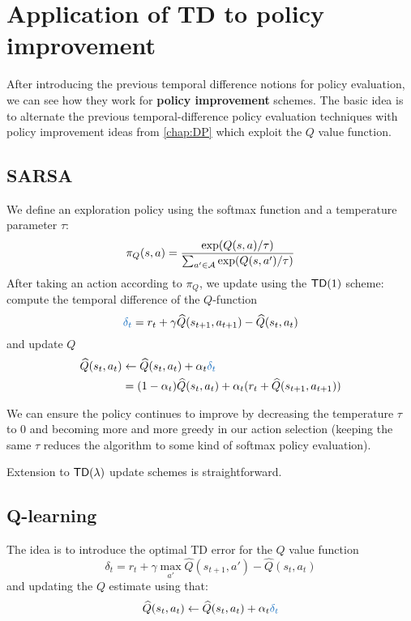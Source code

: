 \documentclass[../course-notes.tex]{subfiles}
\begin{document}
\section{Application of TD to policy improvement}

After introducing the previous temporal difference notions for policy evaluation, we can see how they work for \textbf{policy improvement} schemes. The basic idea is to alternate the previous temporal-difference policy evaluation techniques with policy improvement ideas from \cref{chap:DP} which exploit the $Q$ value function.

\subsection{SARSA}

We define an exploration policy using the softmax function and a temperature parameter $\tau$:
\[
	\pi_Q(s,a) =
	\frac{\exp(Q(s,a)/\tau)}{
		\sum_{a'\in\mathcal{A}} \exp(Q(s,a')/\tau)
	}
\]
After taking an action according to $\pi_Q$, we update using the $\mathsf{TD}(1)$ scheme: compute the temporal difference of the $Q$-function
\begin{equation}\label{eq:QfuncTDerror}
	{\bluefont \delta_t} = r_t + \gamma \widehat{Q}(s_{t+1}, a_{t+1}) - \widehat{Q}(s_t, a_t)
\end{equation}
and update $Q$
\begin{equation*}
\begin{aligned}
	\widehat{Q}(s_t, a_t) &\leftarrow
	\widehat{Q}(s_t, a_t) + \alpha_t {\bluefont \delta_t}  \\
	&= (1-\alpha_t)\widehat{Q}(s_t, a_t)
	+ \alpha_t (r_t + \widehat{Q}(s_{t+1}, a_{t+1}))
\end{aligned}
\end{equation*}

We can ensure the policy continues to improve by decreasing the temperature $\tau$ to 0 and becoming more and more greedy in our action selection (keeping the same $\tau$ reduces the algorithm to some kind of softmax policy evaluation).

Extension to $\mathsf{TD}(\lambda)$ update schemes is straightforward.



\subsection{Q-learning}

The idea is to introduce the optimal TD error for the $Q$ value function
\begin{equation}
	\delta_t = r_t + \gamma \max_{a'}\widehat{Q}(s_{t+1},a') - \widehat{Q}(s_t,a_t)
\end{equation}
and updating the $Q$ estimate using that:
\[
	\widehat{Q}(s_t,a_t) \leftarrow \widehat{Q}(s_t,a_t) + \alpha_t {\bluefont\delta_t}
\]
\end{document}
